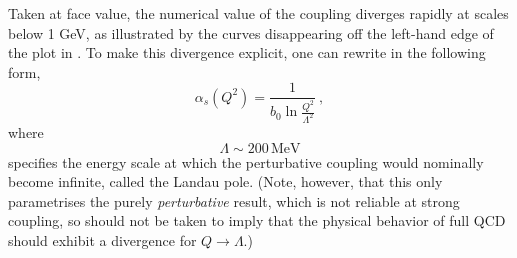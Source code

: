 Taken at face value, the numerical value of the coupling diverges
rapidly at scales below 1 GeV, as illustrated by the curves
disappearing off the left-hand edge of the plot in
. To make this divergence
explicit, one can rewrite
 in the following form, 
\begin{equation}
\alpha_s(Q^2) = \frac{1}{b_0 \ln \frac{Q^2}{\Lambda^2}}~,\label{eq:alphasLam}
\end{equation}
where 
\begin{equation}
\Lambda \sim 200\, \mbox{MeV}
\end{equation}
%
%
%
specifies the energy scale at which the perturbative coupling would nominally become
infinite, called the Landau pole. (Note, however, that this only
parametrises the purely \emph{perturbative} result, which is not
reliable at strong coupling, so  should 
not be taken to imply that the physical behavior of full QCD should
exhibit a divergence for $Q\to \Lambda$.) 

